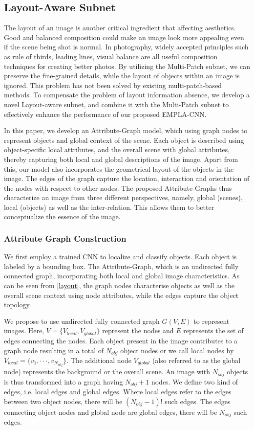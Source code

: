 \documentclass[10pt,twocolumn,letterpaper]{article}
\begin{document}
\subsection{Layout-Aware Subnet}
The layout of an image is another critical ingredient that
affecting aesthetics. Good and balanced composition could make an 
image look more appealing even if the scene being shot is normal. 
In photography, widely accepted principles such as rule of thirds, 
leading lines, visual balance are all useful composition techniques 
for creating better photos. 
By utilizing the Multi-Patch subnet, we can preserve the fine-grained 
details, while the layout of objects within an image is ignored. 
This problem has not been solved by existing multi-patch-based methods. 
To compensate the problem of layout information absence, we develop
a novel Layout-aware subnet, and combine it with the Multi-Patch subnet 
to effectively enhance the performance of our proposed EMPLA-CNN.

In this paper, we develop an Attribute-Graph model, which using graph 
nodes to represent objects and global context of the scene. Each object is 
described using object-specific local attributes, and the overall 
scene with global attributes, thereby capturing both local and global 
descriptions of the image. Apart from this, our model also incorporates 
the geometrical layout of the objects in the image. The edges of the 
graph capture the location, interaction and orientation of the nodes 
with respect to other nodes. The proposed Attribute-Graphs thus characterize
an image from three different perspectives, namely, 
global (scenes), local (objects) as well as the inter-relation. 
This allows them to better conceptualize the essence of the image.

\subsubsection{Attribute Graph Construction}
We first employ a trained CNN to localize and classify objects. Each 
object is labeled by a bounding box. The Attribute-Graph, which is an 
undirected fully connected graph, incorporating both local and global 
image characteristics. As can be seen from \ref{layout},
the graph nodes characterise objects as well as the overall scene context using 
node attributes,  while the edges capture the object topology. 

We propose to use undirected fully connected graph $G(V,E)$ to represent images.
Here, $V = \{ {V_{local}},{V_{global}}\}$ represent the nodes and $E$ represents the set of edges connecting the nodes. Each object present in the image contributes to a graph node resulting in a total of $N_{obj}$ object nodes or we call local nodes by ${V_{local}} = \{ {v_1}, \cdot  \cdot  \cdot ,{v_{{N_{obj}}}}\} $. The additional node $V_{global}$ (also referred to as the global node) represents the background or the overall scene. An image with $N_{obj}$ objects is thus transformed into a graph having $N_{obj}+1$ nodes. We define two kind of edges, i.e. local edges and global edges. Where local edges refer to the edges between two object nodes, there will be $({N_{obj}} - 1)!$ such edges. The edges connecting object nodes and global node are global edges, there will be $N_{obj}$ such edges.
\end{document}
